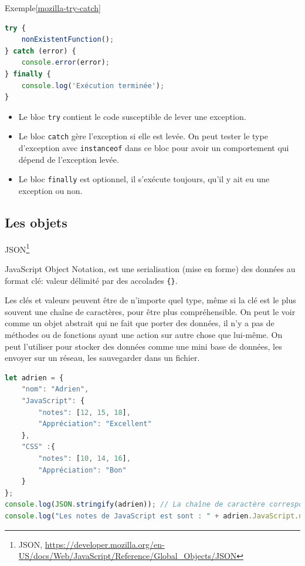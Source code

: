 \documentclass{beamer}
\begin{document}
    \begin{frame}[fragile]{Exemple\cref{mozilla-try-catch}}
        \begin{lstlisting}[language=JavaScript,title={\tiny{Script JavaScript}}]
try {
    nonExistentFunction();
} catch (error) {
    console.error(error);
} finally {
    console.log('Exécution terminée');
}
        \end{lstlisting}
        \begin{itemize}
            \item Le bloc \texttt{try} contient le code susceptible de lever une exception.
            \item Le bloc \texttt{catch} gère l'exception si elle est levée.
            On peut tester le type d'exception avec \lstinline{instanceof} dans ce bloc pour avoir un comportement qui dépend de l'exception levée.
            \item Le bloc \texttt{finally} est optionnel, il s'exécute toujours, qu'il y ait eu une exception ou non.
        \end{itemize}
    \end{frame}

    \subsection{Les objets}\label{subsec:object}

    \begin{frame}[fragile]{JSON\footnote{JSON, \url{https://developer.mozilla.org/en-US/docs/Web/JavaScript/Reference/Global_Objects/JSON}}}
        \begin{footnotesize}
            JavaScript Object Notation, est une serialisation (mise en forme) des données au format clé: valeur délimité par des accolades \lstinline!{}!.

            Les clés et valeurs peuvent être de n'importe quel type, même si la clé est le plus souvent une chaîne de caractères, pour être plus compréhensible.
            \bigbreak
            On peut le voir comme un objet abstrait qui ne fait que porter des données, il n'y a pas de méthodes ou de fonctions ayant une action sur autre chose que lui-même.
            On peut l'utiliser pour stocker des données comme une mini base de données, les envoyer sur un réseau, les sauvegarder dans un fichier.
        \end{footnotesize}
        \begin{lstlisting}[language=JavaScript,title={\tiny{Script JavaScript}},basicstyle=\tiny\ttfamily]
let adrien = {
    "nom": "Adrien",
    "JavaScript": {
        "notes": [12, 15, 18],
        "Appréciation": "Excellent"
    },
    "CSS" :{
        "notes": [10, 14, 16],
        "Appréciation": "Bon"
    }
};
console.log(JSON.stringify(adrien)); // La chaîne de caractère correspondante
console.log("Les notes de JavaScript est sont : " + adrien.JavaScript.notes);
        \end{lstlisting}
    \end{frame}
\end{document}
